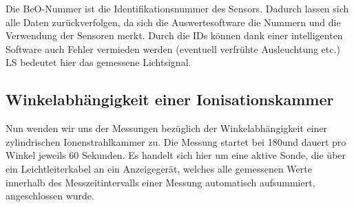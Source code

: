 Die BeO-Nummer ist die Identifikationsnummer des Sensors. Dadurch lassen sich alle Daten zurückverfolgen, da sich die Auswertesoftware die Nummern und die Verwendung der Sensoren merkt. Durch die IDs können dank einer intelligenten Software auch Fehler vermieden werden (eventuell verfrühte Ausleuchtung etc.) LS bedeutet hier das gemessene Lichtsignal.
		
\subsection{Winkelabhängigkeit einer Ionisationskammer} \label{sec:Ionkammer}

Nun wenden wir uns der Messungen bezüglich der Winkelabhängigkeit einer zylindrischen Ionenstrahlkammer zu. Die Messung startet bei 180\textdegree und dauert pro Winkel jeweils 60 Sekunden.
Es handelt sich hier um eine aktive Sonde, die über ein Leichtleiterkabel an ein Anzeigegerät, welches alle gemessenen Werte innerhalb des Messzeitintervalls einer Messung automatisch aufsummiert, angeschlossen wurde.


